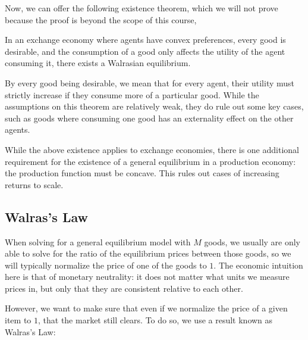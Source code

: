 Now, we can offer the following existence theorem, which we will not prove because the proof is beyond the scope of this course,
\begin{theorem*}
    In an exchange economy where agents have convex preferences, every good is desirable, and the consumption of a good only affects the utility of the agent consuming it, there exists a Walrasian equilibrium. 
\end{theorem*}
By every good being desirable, we mean that for every agent, their utility must strictly increase if they consume more of a particular good. While the assumptions on this theorem are relatively weak, they do rule out some key cases, such as goods where consuming one good has an externality effect on the other agents.

While the above existence applies to exchange economies, there is one additional requirement for the existence of a general equilibrium in a production economy: the production function must be concave. This rules out cases of increasing returns to scale. 

\subsection*{Walras's Law}
When solving for a general equilibrium model with $M$ goods, we usually are only able to solve for the ratio of the equilibrium prices between those goods, so we will typically normalize the price of one of the goods to $1$. The economic intuition here is that of monetary neutrality: it does not matter what units we measure prices in, but only that they are consistent relative to each other. 

However, we want to make sure that even if we normalize the price of a given item to $1$, that the market still clears. To do so, we use a result known as Walras's Law:

